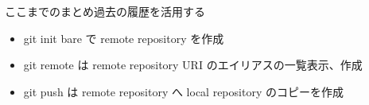 
\begin{frame}[t]{ここまでのまとめ}{過去の履歴を活用する}

  \begin{itemize}
  \item git init {\dhyphen}bare で remote repository を作成
    \vspace{2ex}

  \item git remote は remote repository URI のエイリアスの一覧表示、作成
    \vspace{2ex}

  \item git push は remote repository へ local repository のコピーを作成
  \end{itemize}

\end{frame}
